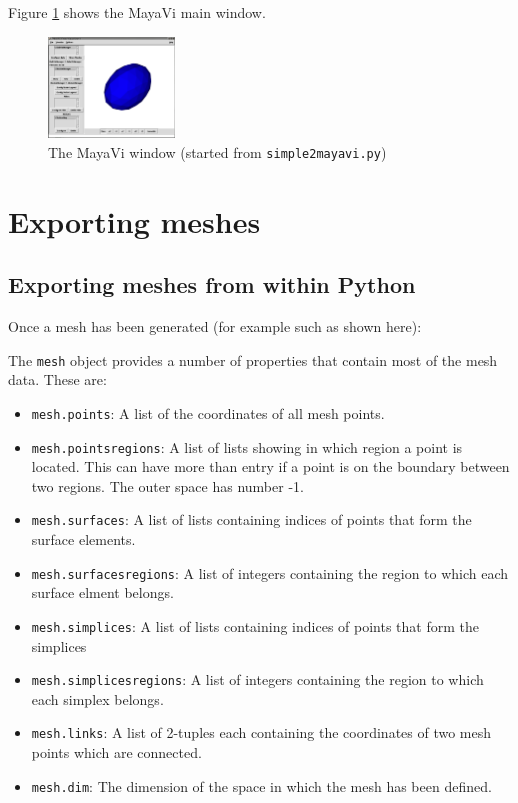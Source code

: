 \documentclass[10pt,a4paper]{book}
\begin{document}
Figure \ref{fig:mayavisnapshot} shows the MayaVi main window.

\begin{figure}[tbhp]
\centerline{\includegraphics[width=0.3\textwidth]{figures/mayavisnapshot}}
\caption{\label{fig:mayavisnapshot} The MayaVi window (started from \texttt{simple2mayavi.py})}
\end{figure}



\section{Exporting meshes}

\subsection{Exporting meshes from within Python}\label{sec:exporting-meshes}

Once a mesh has been generated (for example such as shown here): 


The \texttt{mesh} object provides a number of properties that contain
most of the mesh data. These are:

\begin{itemize}
\item \texttt{mesh.points}: A list of the coordinates of all mesh points.
\item \texttt{mesh.pointsregions}: A list of lists showing in which region a point is located. This can have more than entry if a point is on the boundary between two regions. The outer space has number -1.
\item \texttt{mesh.surfaces}: A list of lists containing indices of points that form the surface elements.
\item \texttt{mesh.surfacesregions}: A list of integers containing the region to which each surface elment belongs.
\item \texttt{mesh.simplices}: A list of lists containing indices of points that form the simplices
\item \texttt{mesh.simplicesregions}: A list of integers containing the region to which each simplex belongs.

\item \texttt{mesh.links}: A list of 2-tuples each containing the coordinates of two mesh points which are connected.

\item \texttt{mesh.dim}: The dimension of the space in which the mesh has been defined.
\end{itemize}
\end{document}
